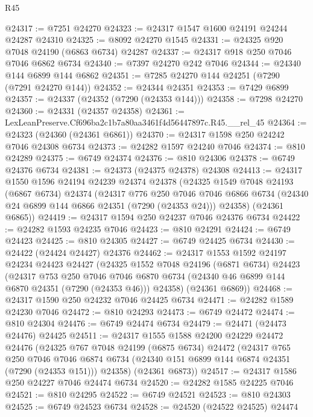 \begin{lexlean}{R45}
\begin{coremodule}
{@24317 := @7251 @24270
@24323 := @24317 @1547 @1600 @24191 @24244 @24287 @24310
@24325 := @8092 @24270 @1545
@24331 := @24325 @920 @7048 @24190 (@6863 @6734) @24287
@24337 := @24317 @918 @250 @7046 @7046 @6862 @6734
@24340 := @7397 @24270 @242 @7046
@24344 := @24340 @144 @6899 @144 @6862
@24351 := @7285 @24270 @144 @24251 (@7290 (@7291 @24270 @144))
@24352 := @24344 @24351
@24353 := @7429 @6899
@24357 := @24337 (@24352 (@7290 (@24353 @144)))
@24358 := @7298 @24270
@24360 := @24331 (@24357 @24358)
@24361 := LexLeanPreserve.Cf696ba2c1b7a80aa3461f4d56447897c.R45.__rel_45
@24364 := @24323 (@24360 (@24361 @6861))
@24370 := @24317 @1598 @250 @24242 @7046 @24308 @6734
@24373 := @24282 @1597 @24240 @7046
@24374 := @810 @24289
@24375 := @6749 @24374
@24376 := @810 @24306
@24378 := @6749 @24376 @6734
@24381 := @24373 (@24375 @24378) @24308
@24413 := @24317
    @1550
    @1596
    @24194
    @24239
    @24374
    @24378
    (@24325
      @1549
      @7048
      @24193
      (@6867 @6734)
      @24374
      (@24317
        @776
        @250
        @7046
        @7046
        @6866
        @6734
        (@24340 @24 @6899 @144 @6866 @24351 (@7290 (@24353 @24)))
        @24358)
      (@24361 @6865))
@24419 := @24317 @1594 @250 @24237 @7046 @24376 @6734
@24422 := @24282 @1593 @24235 @7046
@24423 := @810 @24291
@24424 := @6749 @24423
@24425 := @810 @24305
@24427 := @6749 @24425 @6734
@24430 := @24422 (@24424 @24427) @24376
@24462 := @24317
    @1553
    @1592
    @24197
    @24234
    @24423
    @24427
    (@24325
      @1552
      @7048
      @24196
      (@6871 @6734)
      @24423
      (@24317
        @753
        @250
        @7046
        @7046
        @6870
        @6734
        (@24340 @46 @6899 @144 @6870 @24351 (@7290 (@24353 @46)))
        @24358)
      (@24361 @6869))
@24468 := @24317 @1590 @250 @24232 @7046 @24425 @6734
@24471 := @24282 @1589 @24230 @7046
@24472 := @810 @24293
@24473 := @6749 @24472
@24474 := @810 @24304
@24476 := @6749 @24474 @6734
@24479 := @24471 (@24473 @24476) @24425
@24511 := @24317
    @1555
    @1588
    @24200
    @24229
    @24472
    @24476
    (@24325
      @767
      @7048
      @24199
      (@6875 @6734)
      @24472
      (@24317
        @765
        @250
        @7046
        @7046
        @6874
        @6734
        (@24340 @151 @6899 @144 @6874 @24351 (@7290 (@24353 @151)))
        @24358)
      (@24361 @6873))
@24517 := @24317 @1586 @250 @24227 @7046 @24474 @6734
@24520 := @24282 @1585 @24225 @7046
@24521 := @810 @24295
@24522 := @6749 @24521
@24523 := @810 @24303
@24525 := @6749 @24523 @6734
@24528 := @24520 (@24522 @24525) @24474
}
\end{coremodule}
\end{lexlean}
